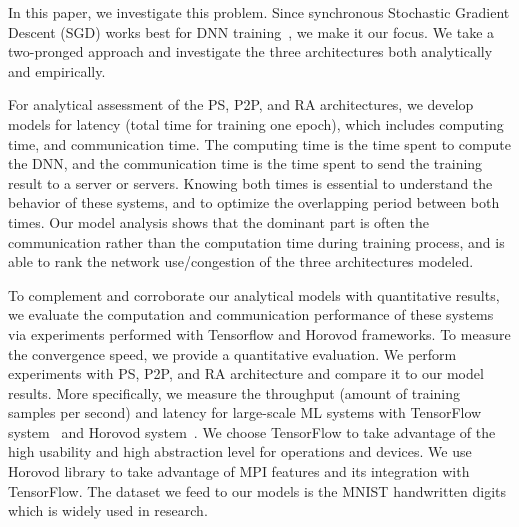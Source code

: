 \documentclass[conference]{IEEEtran}
\begin{document}

In this paper, we investigate this problem. Since synchronous Stochastic Gradient Descent (SGD) works best for DNN training~\cite{chen2016revisiting}, we make it our focus. We take a two-pronged approach and investigate the three architectures both analytically and empirically.

For analytical assessment of the PS, P2P, and RA architectures, we develop models for latency (total time for training one epoch), which includes computing time, and communication time. The computing time is the time spent to compute the DNN, and the communication time is the time spent to send the training result to a server or servers. Knowing both times is essential to understand the behavior of these systems, and to optimize the overlapping period between both times. Our model analysis shows that the dominant part is often the communication rather than the computation time during training process, and is able to rank the network use/congestion of the three architectures modeled.

To complement and corroborate our analytical models with quantitative results, we evaluate the computation and communication performance of these systems via experiments performed with Tensorflow and Horovod frameworks. To measure the convergence speed, we provide a quantitative evaluation. We perform experiments with PS, P2P, and RA architecture and compare it to our model results. More specifically, we measure the throughput (amount of training samples per second) and latency for large-scale ML systems with TensorFlow system~\cite{abadi2016tensorflow} and Horovod system~\cite{sergeev2018horovod}. We choose TensorFlow to take advantage of the high usability and high abstraction level for operations and devices. We use Horovod library to take advantage of MPI features and its integration with TensorFlow. The dataset we feed to our models is the MNIST handwritten digits which is widely used in research.
\end{document}
